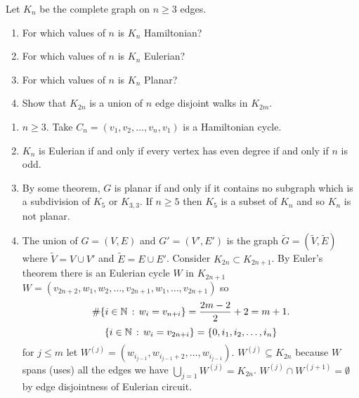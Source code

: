\documentclass[10pt, a4paper]{article}
\begin{document}
\begin{problem}
    Let $K_n$ be the complete graph on $n \geq 3$ edges.
    \begin{enumerate}[label = (\alph*)]
        \item For which values of $n$ is $K_n$ Hamiltonian?
        
        \item For which values of $n$ is $K_n$ Eulerian?
        
        \item For which values of $n$ is $K_n$ Planar?

        \item Show that $K_{2n}$ is a union of $n$ edge disjoint walks in $K_{2m}$.
    \end{enumerate}

    \begin{solution}
        \begin{enumerate}[label = (\alph*)]
            \item $n \geq 3$.
            Take $C_n = (v_1, v_2, \dotsc, v_n, v_1)$ is a Hamiltonian cycle.

            \item $K_n$ is Eulerian if and only if every vertex has even degree if and only if $n$ is odd.

            \item 
            By some theorem,
            $G$ is planar if and only if it contains no subgraph which is a subdivision of $K_5$ or $K_{3, 3}$.
            If $n \geq 5$ then $K_5$ is a subset of $K_n$ and so $K_n$ is not planar.

            \item
            The union of $G = (V, E)$ and $G' = (V', E')$ is the graph $\tilde{G} = (\tilde{V}, \tilde{E})$ where $\tilde{V} = V \cup V'$ and $\tilde{E} = E \cup E'$.
            Consider $K_{2n} \subset K_{2n + 1}$.
            By Euler's theorem there is an Eulerian cycle $W$ in $K_{2n + 1}$
            $W = (v_{2n + 2}, w_1, w_2, \dotsc, v_{2n + 1}, w_1, \dotsc, v_{2n + 1})$ so
            \[
            \#\{i \in \mathbb{N}\,:\,w_i = v_{n + i}\} = \frac{2m - 2}{2} + 2 = m + 1.
            \]
            \[
            \{i \in \mathbb{N}\,:\,w_i = v_{2n + i}\} = \{0, i_1, i_2, \dotsc, i_n\}
            \]
            for $j \leq m$ let $W ^ {(j)} = (w_{i_{j - 1}}, w_{i_{j - 1} + 2}, \dotsc, w_{i_{j - 1}})$.
            $W ^ {(j)} \subseteq K_{2n}$ because $W$ spans
            (uses)
            all the edges we have $\bigcup_{j = 1}W ^ {(j)} = K_{2n}$.
            $W ^ {(j)} \cap W ^ {(j + 1)} = \emptyset$ by edge disjointness of Eulerian circuit.
        \end{enumerate}
    \end{solution}
\end{problem}
\end{document}
